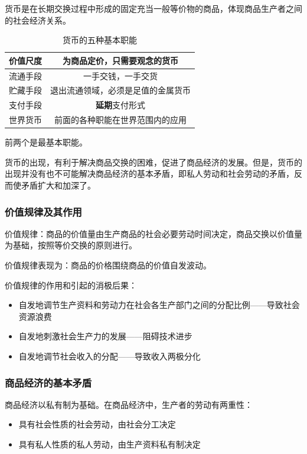 \documentclass[12pt, a4paper, oneside]{ctexart}
\begin{document}
货币是在长期交换过程中形成的固定充当一般等价物的商品，体现商品生产者之间的社会经济关系。

\begin{table}[h]
  \centering
  \caption{货币的五种基本职能}
  \begin{tabular}{|c|c|}
    \hline
    价值尺度 & 为商品定价，只需要观念的货币 \\ \hline
    流通手段 & 一手交钱，一手交货 \\ \hline
    贮藏手段 & 退出流通领域，必须是足值的金属货币 \\ \hline
    支付手段 & \textbf{延期}支付形式 \\ \hline
    世界货币 & 前面的各种职能在世界范围内的应用 \\
    \hline
  \end{tabular}
\end{table}

前两个是最基本职能。

货币的出现，有利于解决商品交换的困难，促进了商品经济的发展。但是，货币的出现并没有也不可能解决商品经济的基本矛盾，即私人劳动和社会劳动的矛盾，反而使矛盾扩大和加深了。

\subsubsection{价值规律及其作用}

价值规律：商品的价值量由生产商品的社会必要劳动时间决定，商品交换以价值量为基础，按照等价交换的原则进行。

价值规律表现为：商品的价格围绕商品的价值自发波动。

价值规律的作用和引起的消极后果：
\begin{itemize}
  \item 自发地调节生产资料和劳动力在社会各生产部门之间的分配比例——导致社会资源浪费
  \item 自发地刺激社会生产力的发展——阻碍技术进步
  \item 自发地调节社会收入的分配——导致收入两极分化
\end{itemize}

\subsubsection{商品经济的基本矛盾}

商品经济以私有制为基础。在商品经济中，生产者的劳动有两重性：
\begin{itemize}
  \item 具有社会性质的社会劳动，由社会分工决定
  \item 具有私人性质的私人劳动，由生产资料私有制决定
\end{itemize}
\end{document}
